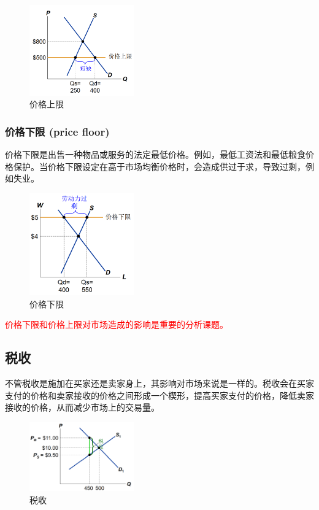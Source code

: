 \documentclass[12pt, a4paper]{article}
\begin{document}
\begin{figure}[H] 
  \centering
  \includegraphics[width=0.4\textwidth]{价格上限.png}
  \caption{价格上限}
\end{figure}

\subsubsection{价格下限 (price floor)}
价格下限是出售一种物品或服务的法定最低价格。例如，最低工资法和最低粮食价格保护。当价格下限设定在高于市场均衡价格时，会造成供过于求，导致过剩，例如失业。

\begin{figure}[H] 
  \centering
  \includegraphics[width=0.4\textwidth]{价格下限.png}
  \caption{价格下限}
\end{figure}

\textcolor{red}{价格下限和价格上限对市场造成的影响是重要的分析课题。}

\newpage

\subsection{税收}
不管税收是施加在买家还是卖家身上，其影响对市场来说是一样的。税收会在买家支付的价格和卖家接收的价格之间形成一个楔形，提高买家支付的价格，降低卖家接收的价格，从而减少市场上的交易量。

\begin{figure}[H] 
  \centering
  \includegraphics[width=0.4\textwidth]{税收.png}
  \caption{税收}
\end{figure}
\end{document}
